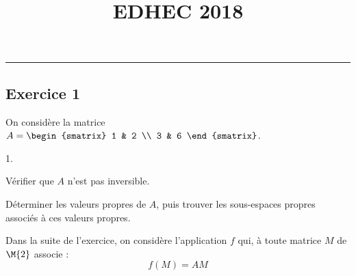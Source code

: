 \documentclass[11pt]{article}%
\title{\bf \vspace{-1.6cm} EDHEC 2018} %
\author{} %
\date{} %
\begin{document}
\maketitle %
\vspace{-1.2cm}\hrule %
\thispagestyle{fancy}

\vspace*{-.2cm}



\subsection*{Exercice 1}

\noindent
On considère la matrice $A =
\begin{smatrix}
  1 & 2 \\
  3 & 6
\end{smatrix}
$.
\begin{noliste}{1.}
  \setlength{\itemsep}{4mm}
\item Vérifier que $A$ n'est pas inversible.

  

\item Déterminer les valeurs propres de $A$, puis trouver les
  sous-espaces propres associés à ces valeurs propres.

  
\end{noliste}
Dans la suite de l'exercice, on considère l'application $f$ qui, à
toute matrice $M$ de $\M{2}$ associe :
\[
f(M) = AM
\]
\end{document}
